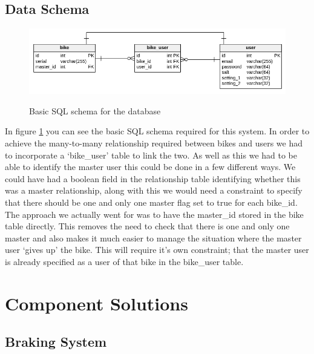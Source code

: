 \documentclass[a4paper]{report}
\begin{document}
\section{Data Schema}
\begin{figure}[h]
\centering
\includegraphics[scale=0.5]{figures/sql}
\label{fig:sql_schema}
\caption{Basic SQL schema for the database}
\end{figure}

In figure \ref{fig:sql_schema} you can see the basic SQL schema required for this system. In order to achieve the many-to-many relationship required between bikes and users we had to incorporate a `bike\_user' table to link the two. As well as this we had to be able to identify the master user this could be done in a few different ways. We could have had a boolean field in the relationship table identifying whether this was a master relationship, along with this we would need a constraint to specify that there should be one and only one master flag set to true for each bike\_id. The approach we actually went for was to have the master\_id stored in the bike table directly. This removes the need to check that there is one and only one master and also makes it much easier to manage the situation where the master user `gives up' the bike. This will require it's own constraint; that the master user is already specified as a user of that bike in the bike\_user table.
\chapter{Component Solutions}
\label{sec:component_solutions}


\section{Braking System}
\label{sec:comp_design_brakes}
\end{document}
